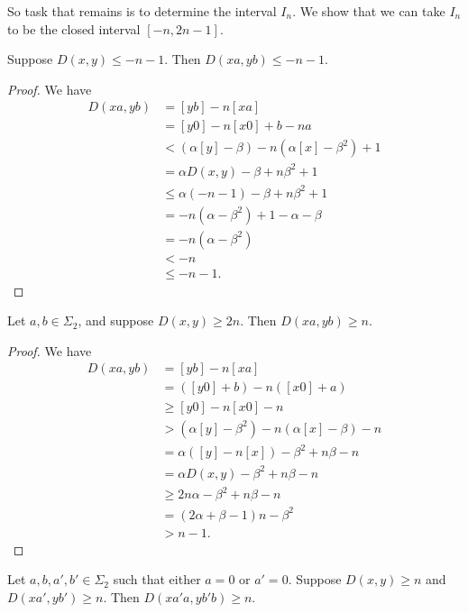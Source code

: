 \documentclass[12pt,reqno]{article}
\begin{document}
So task that remains is  to determine the
interval $I_n$. We show that we can take $I_n$ to be the closed interval $[-n, 2n-1]$.
\begin{lemma}
Suppose $D(x,y) \leq -n-1$.  Then $D(xa,yb) \leq -n-1$.
\label{lemma:I_n-lower}
\end{lemma}
\begin{proof}
We have
\begin{align*}
D(xa,yb) &= [yb] - n [xa] \\
&= [y0]-n[x0] + b-na \\
&< (\alpha [y] - \beta)  - n (\alpha[x] - \beta^2) + 1 \\
&= \alpha D(x,y) - \beta + n \beta^2 + 1\\
&\leq \alpha (-n-1) - \beta + n \beta^2 + 1 \\
& = -n(\alpha - \beta^2) + 1-\alpha-\beta \\
& = -n(\alpha - \beta^2) \\
& < -n \\ 
& \leq -n-1.
\end{align*}
\end{proof}

\begin{lemma}
Let $a, b \in \Sigma_2$, and
suppose $D(x,y) \geq 2n$.  Then $D(xa,yb) \geq n$.
\label{lemma:I_n-upper-2n}
\end{lemma}
\begin{proof}
We have
\begin{align*}
D(xa,yb) &= [yb]-n[xa] \\
&= ([y0] + b) - n([x0] + a) \\
&\geq [y0] - n[x0] - n \\
&> (\alpha [y] - \beta^2) - n(\alpha[x] - \beta) -n \\
&= \alpha([y]-n[x]) -\beta^2 + n\beta - n \\
&= \alpha D(x,y) - \beta^2 + n\beta - n \\
&\geq 2n\alpha - \beta^2 + n \beta - n \\
&= (2\alpha + \beta - 1)n - \beta^2 \\
&> n - 1.
\end{align*}
\end{proof}

\begin{lemma}
Let $a,b, a', b' \in \Sigma_2$ such that
either $a = 0$ or $a' = 0$.
Suppose $D(x,y) \geq n$ and $D(xa',yb') \geq n$.  Then
$D(xa'a, yb'b) \geq n$.
\label{lemma:I_n-upper-n}
\end{lemma}
\end{document}

